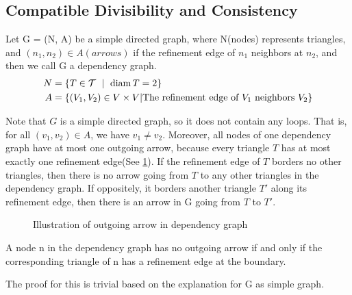     \subsection{Compatible Divisibility and Consistency}
    \begin{definition*}
      Let G = (N, A) be a simple directed graph, where N(nodes) represents triangles, and $(n_1, n_2)\in A (arrows)$ if the refinement edge of $n_1$ neighbors at $n_2$, and then we call G a dependency graph.
      \begin{align*}
      N &= \{T\in\mathcal{T}~\mid~\operatorname{diam}{T} = 2\}\\
      A &= \{(V_1, V_2)\in V\times V | \text{The refinement edge of $V_1$ neighbors $V_2$}\}
      \end{align*}
    \end{definition*}
    Note that $G$ is a simple directed graph, so it does not contain any loops. That is, for all $(v_1, v_2)\in A$, we have $v_1\neq v_2$. Moreover, all nodes of one dependency graph have at most one outgoing arrow, because every triangle $T$ has at most exactly one refinement edge(See \ref{Fig9}). If the refinement edge of $T$ borders no other triangles, then there is no arrow going from $T$ to any other triangles in the dependency graph. If oppositely, it borders another triangle $T'$ along its refinement edge, then there is an arrow in G going from $T$ to $T'$.  %
    \begin{figure}[h!]
    \centering
    \caption{Illustration of outgoing arrow in dependency graph}
    \label{Fig9}
    \end{figure}

    \begin{lemma*}
    A node n in the dependency graph has no outgoing arrow if and only if the corresponding triangle of n has a refinement edge at the boundary.
    \end{lemma*}
    The proof for this is trivial based on the explanation for G as simple graph.

